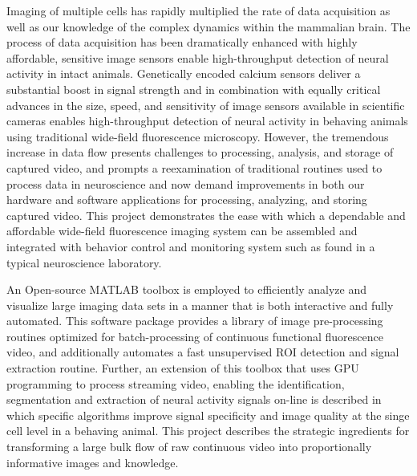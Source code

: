 
Imaging of multiple cells has rapidly multiplied the rate of data acquisition as well as our knowledge of the complex dynamics within the mammalian brain.
The process of data acquisition has been dramatically enhanced with highly affordable, sensitive image sensors enable high-throughput detection of neural activity in intact animals.
Genetically encoded calcium sensors deliver a substantial boost in signal strength and in combination with equally critical advances in the size, speed, and sensitivity of image sensors available in scientific cameras enables high-throughput detection of neural activity in behaving animals using traditional wide-field fluorescence microscopy.
However, the tremendous increase in data flow presents challenges to processing, analysis, and storage of captured video, and prompts a reexamination of traditional routines used to process data in neuroscience and now demand improvements in both our hardware and software applications for processing, analyzing, and storing captured video.
This project demonstrates the ease with which a dependable and affordable wide-field fluorescence imaging system can be assembled and integrated with behavior control and monitoring system such as found in a typical neuroscience laboratory.

An Open-source MATLAB toolbox is employed to efficiently analyze and visualize large imaging data sets in a manner that is both interactive and fully automated.
This software package provides a library of image pre-processing routines optimized for batch-processing of continuous functional fluorescence video, and additionally automates a fast unsupervised ROI detection and signal extraction routine.
Further, an extension of this toolbox that uses GPU programming to process streaming video, enabling the identification, segmentation and extraction of neural activity signals on-line is described in which specific algorithms improve signal specificity and image quality at the singe cell level in a behaving animal.
This  project describes the strategic ingredients for transforming a large bulk flow of raw continuous video into proportionally informative images and knowledge.


%
